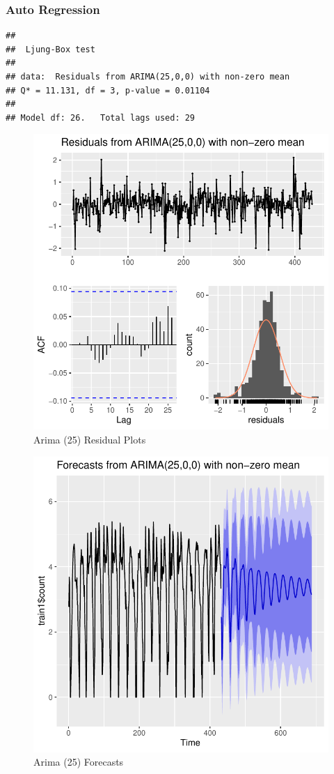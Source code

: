 \documentclass[american,]{article}
\begin{document}
\newpage

\hypertarget{auto-regression}{%
\subsubsection{Auto Regression}\label{auto-regression}}

\begin{verbatim}
## 
##  Ljung-Box test
## 
## data:  Residuals from ARIMA(25,0,0) with non-zero mean
## Q* = 11.131, df = 3, p-value = 0.01104
## 
## Model df: 26.   Total lags used: 29
\end{verbatim}

\begin{figure}[htbp]

{\centering \includegraphics[width=0.45\linewidth]{BikeSharingDemand_files/figure-latex/arima-25-plot-1-1} 

}

\caption{Arima (25) Residual Plots}\label{fig:arima-25-plot-1}
\end{figure}

\begin{figure}[htbp]

{\centering \includegraphics[width=0.45\linewidth]{BikeSharingDemand_files/figure-latex/arima-25-plot-2-1} 

}

\caption{Arima (25) Forecasts}\label{fig:arima-25-plot-2}
\end{figure}
\end{document}
